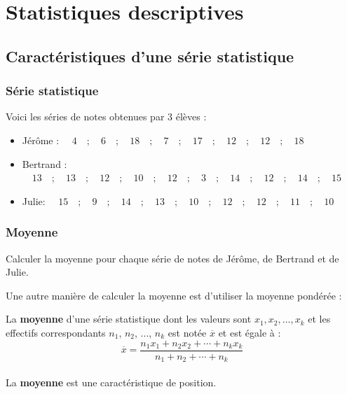



\chapter{Statistiques descriptives}



\section{Caractéristiques d'une série statistique}

\subsection{Série statistique}
Voici les séries de notes obtenues par 3 élèves :
\begin{itemize}[label=\textbullet]
\item  Jérôme : $\quad 4 \quad; \quad 6 \quad; \quad 18 \quad; \quad 7 \quad; \quad 17 \quad ; \quad 12 \quad ; \quad 12 \quad ;\quad  18$
\item Bertrand : $\quad 13 \quad ; \quad 13\quad ; \quad 12 \quad ; \quad 10 \quad ; \quad 12 \quad ; \quad 3\quad ; \quad 14 \quad ; \quad 12 \quad ; \quad 14 \quad ; \quad 15$
\item  Julie: $\quad 15 \quad ; \quad 9 \quad ; \quad 14 \quad ; \quad 13 \quad ; \quad 10 \quad ; \quad 12 \quad ; \quad 12 \quad ; \quad 11 \quad ; \quad 10$
\end{itemize}

\subsection{Moyenne}

Calculer la moyenne pour chaque série de notes de Jérôme, de Bertrand et de Julie.
\vspace{0.1cm}

\ligne

\ligne

\ligne

\ligne

\ligne

\ligne

Une autre manière de calculer la moyenne est d'utiliser la moyenne pondérée : 

\begin{Définition}

La {\bf{moyenne}} d'une série statistique dont les valeurs sont $x_1, x_2 , ..., x_k$ et les effectifs correspondants $n_1$, $n_2$, ..., $n_k$ est notée $\overline{x}$ et est égale à : $$ \overline{x} = \dfrac{n_1x_1 + n_2x_2 + \cdots +n_kx_k}{n_1+n_2+\cdots +n_k}$$\\
La {\bf{moyenne}} est une caractéristique de position.
\end{Définition} 

